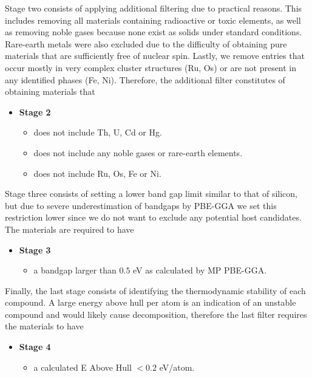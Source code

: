 Stage two consists of applying additional filtering due to practical reasons. This includes removing all materials containing radioactive or toxic elements, as well as removing noble gases because none exist as solids under standard conditions. Rare-earth metals were also excluded due to the difficulty of obtaining pure materials that are sufficiently free of nuclear spin. Lastly, we remove entries that occur mostly in very complex cluster structures (Ru, Os) or are not present in any identified phases (Fe, Ni). Therefore, the additional filter constitutes of obtaining materials that
\begin{itemize}
  \item[]{\textbf{Stage 2}}
  \begin{itemize}
  \item does not include Th, U, Cd or Hg.
  \item does not include any noble gases or rare-earth elements.
  \item does not include Ru, Os, Fe or Ni.
  \end{itemize}
\end{itemize}

\noindent Stage three consists of setting a lower band gap limit similar to that of silicon, but due to severe underestimation of bandgaps by PBE-GGA we set this restriction lower since we do not want to exclude any potential host candidates. The materials are required to have
\begin{itemize}
  \item[]{\textbf{Stage 3}}
  \begin{itemize}
  \item a bandgap larger than $0.5$ eV as calculated by MP PBE-GGA.
  \end{itemize}
\end{itemize}

\noindent Finally, the last stage consists of identifying the thermodynamic stability of each compound. A large energy above hull per atom is an indication of an unstable compound and would likely cause decomposition, therefore the last filter requires the materials to have

\begin{itemize}
  \item[]{\textbf{Stage 4}}
  \begin{itemize}
  \item a calculated E Above Hull $<0.2$ eV/atom.
  \end{itemize}
\end{itemize}

